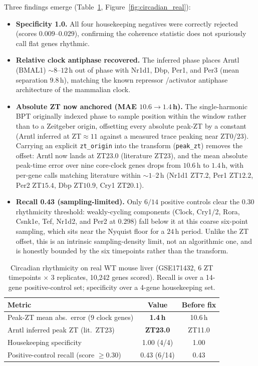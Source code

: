 \documentclass[preprint,12pt,amsmath,amssymb,superscriptaddress,floatfix]{revtex4-2}
\begin{document}
Three findings emerge (Table~\ref{tab:circadian_real}, Figure~\ref{fig:circadian_real}):
\begin{itemize}
    \item \textbf{Specificity 1.0.} All four housekeeping negatives were
    correctly rejected (scores $0.009$--$0.029$), confirming the coherence
    statistic does not spuriously call flat genes rhythmic.
    \item \textbf{Relative clock antiphase recovered.} The inferred phase
    places Arntl (BMAL1) $\sim 8$--$12$\,h out of phase with Nr1d1, Dbp,
    Per1, and Per3 (mean separation $9.8$\,h), matching the known repressor
    /activator antiphase architecture of the mammalian clock.
    \item \textbf{Absolute ZT now anchored (MAE $10.6\to1.4$\,h).} The
    single-harmonic BPT originally indexed phase to sample position within the
    window rather than to a Zeitgeber origin, offsetting every absolute
    peak-ZT by a constant (Arntl inferred at ZT${\approx}11$ against a measured
    trace peaking near ZT0/23). Carrying an explicit \texttt{zt\_origin} into
    the transform (\texttt{peak\_zt}) removes the offset: Arntl now lands at
    ZT$23.0$ (literature ZT23), and the mean absolute peak-time error over nine
    core-clock genes drops from $10.6$\,h to $1.4$\,h, with per-gene calls
    matching literature within $\sim1$--$2$\,h (Nr1d1 ZT$7.2$, Per1 ZT$12.2$,
    Per2 ZT$15.4$, Dbp ZT$10.9$, Cry1 ZT$20.1$).
    \item \textbf{Recall 0.43 (sampling-limited).} Only $6/14$ positive
    controls clear the $0.30$ rhythmicity threshold: weakly-cycling components
    (Clock, Cry1/2, Rora, Csnk1e, Tef, Nr1d2, and Per2 at $0.298$) fall below
    it at this coarse six-point sampling, which sits near the Nyquist floor for
    a $24$\,h period. Unlike the ZT offset, this is an intrinsic
    sampling-density limit, not an algorithmic one, and is honestly bounded by
    the six timepoints rather than the transform.
\end{itemize}

\begin{table}[h]
\centering
\caption{Circadian rhythmicity on real WT mouse liver (GSE171432, 6 ZT
timepoints $\times$ 3 replicates, 10{,}242 genes scored). Recall is over a
14-gene positive-control set; specificity over a 4-gene housekeeping set.}
\label{tab:circadian_real}
\begin{tabular}{lcc}
\toprule
\textbf{Metric} & \textbf{Value} & \textbf{Before fix} \\
\midrule
Peak-ZT mean abs.\ error (9 clock genes) & \textbf{1.4\,h} & 10.6\,h \\
Arntl inferred peak ZT (lit.\ ZT23)       & \textbf{ZT23.0} & ZT11.0 \\
Housekeeping specificity                   & 1.00 (4/4) & 1.00 \\
Positive-control recall (score $\geq 0.30$) & 0.43 (6/14) & 0.43 \\
\bottomrule
\end{tabular}
\end{table}
\end{document}

